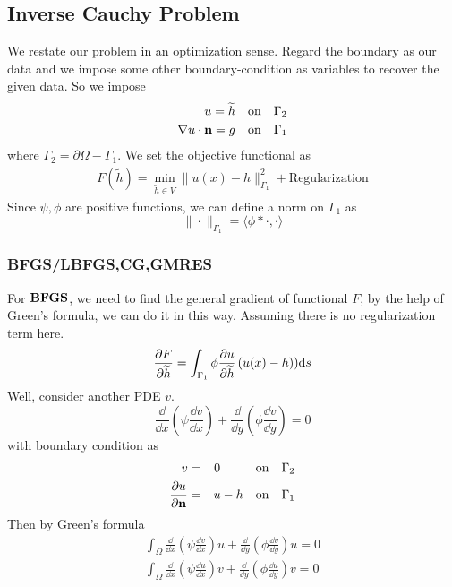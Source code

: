 \documentclass{note}
\begin{document}
\subsection{Inverse Cauchy Problem}
We restate our problem in an optimization sense. Regard the boundary as our data and we impose some other boundary-condition as variables to recover the given data. So we impose
\begin{eqnarray}
u  = \widetilde{h} \quad\mbox{on}\quad \Gamma_2 \\
\nabla u \cdot \mathbf{n} = g \quad\mbox{on}\quad \Gamma_1
\end{eqnarray}
where $\Gamma_2 = \partial\Omega-\Gamma_1$. We set the objective functional as
\begin{eqnarray}
F(\widetilde{h}) = \min_{\widetilde{h}\in V} \|u(x) - h\|_{\Gamma_1}^2 + \mbox{Regularization}
\end{eqnarray}
Since $\psi, \phi$ are positive functions, we can define a norm on $\Gamma_1$ as
 $$\|\cdot\|_{\Gamma_1} = \langle\phi*\cdot,\cdot\rangle$$
\subsubsection{BFGS/LBFGS,CG,GMRES}
For $\mathbf{BFGS}$, we need to find the general gradient of functional $F$, by the help of Green's formula, we can do it in this way. Assuming there is no regularization term here.
\begin{equation}
\frac{\partial F}{\partial \widetilde{h}} = \int_{\Gamma_1} \phi \frac{\partial u}{\partial \widetilde{h}}\left(u(x)-h\right))\mathrm{d} s
\end{equation}
Well, consider another PDE \wrt $v$.
\begin{equation}
\frac{\dd}{\dd x}\left(\psi \frac{\dd v}{\dd x}\right) + \frac{\dd}{\dd y}\left(\phi \frac{\dd v}{\dd y}\right) = 0
\end{equation}
with boundary condition as
\begin{eqnarray}
v &=& 0 \quad\quad\;\;\;\mbox{on}\quad \Gamma_2 \\
\frac{\partial u}{\partial \mathbf{n}} &=& u-h \quad\mbox{on}\quad \Gamma_1
\end{eqnarray}
Then by Green's formula
\begin{eqnarray}
\int_{\Omega} \frac{\dd}{\dd x}\left(\psi \frac{\dd v}{\dd x}\right)u + \frac{\dd}{\dd y}\left(\phi \frac{\dd v}{\dd y}\right)u = 0\\
\int_{\Omega}\frac{\dd}{\dd x}\left(\psi \frac{\dd u}{\dd x}\right)v + \frac{\dd}{\dd y}\left(\phi \frac{\dd u}{\dd y}\right)v = 0
\end{eqnarray}
\end{document}
